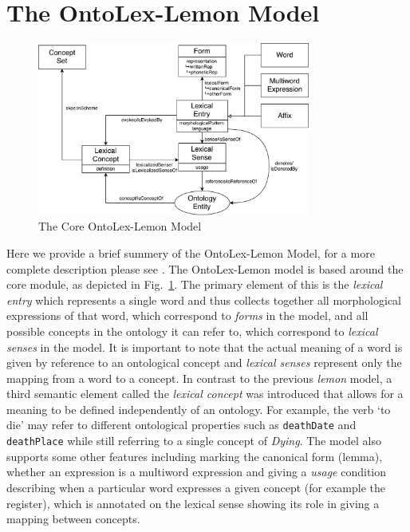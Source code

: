 \documentclass[12pt,a4paper]{elex2017}
\begin{document}
\section{The OntoLex-Lemon Model}

\begin{figure}
    \begin{center}
\includegraphics[width=0.8\textwidth]{LemonOntoLexCore.pdf}
    \end{center}
\caption{\label{fig:core}The Core OntoLex-Lemon Model}
\end{figure}

Here we provide a brief summery of the OntoLex-Lemon Model, for a more complete
description please see \cite{cimiano2016lexicon}.
The OntoLex-Lemon model is based around the core module, as depicted in
Fig.~\ref{fig:core}. The primary element of this is the \emph{lexical entry}
which represents a single word and thus collects together all morphological
expressions of that word, which correspond to \emph{forms} in the model, and all
possible concepts in the ontology it can refer to, which correspond to
\emph{lexical senses} in the model. It is important to note that the actual
meaning of a word is given by reference to an ontological concept and
\emph{lexical senses} represent only the mapping from a word to a concept. In
contrast to the previous \emph{lemon} model, a third semantic element called the
\emph{lexical concept} was introduced that allows for a meaning to be defined
independently of an ontology. For example, the verb `to die' may refer to
different ontological properties such as \texttt{deathDate} and \texttt{deathPlace} while
still referring to a single concept of \emph{Dying}. The model also supports
some other features including marking the canonical form (lemma), whether an
expression is a multiword expression and giving a \emph{usage} condition
describing when a particular word expresses a given concept (for example the
register), which is annotated on the lexical sense showing its role in giving a
mapping between concepts.
\end{document}
